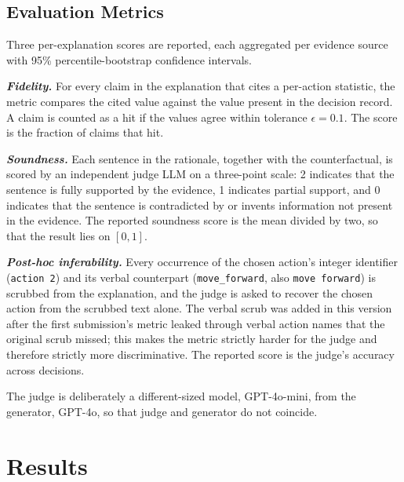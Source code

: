 \documentclass[conference]{IEEEtran}
\begin{document}
\subsection{Evaluation Metrics}
\label{sec:metrics}
Three per-explanation scores are reported, each aggregated per
evidence source with 95\% percentile-bootstrap confidence intervals.

\textbf{\emph{Fidelity.}} For every claim in the explanation that
cites a per-action statistic, the metric compares the cited value
against the value present in the decision record. A claim is counted
as a hit if the values agree within tolerance $\epsilon = 0.1$. The
score is the fraction of claims that hit.

\textbf{\emph{Soundness.}} Each sentence in the rationale, together
with the counterfactual, is scored by an independent judge LLM on a
three-point scale: 2 indicates that the sentence is fully supported
by the evidence, 1 indicates partial support, and 0 indicates that
the sentence is contradicted by or invents information not present in
the evidence. The reported soundness score is the mean divided by two,
so that the result lies on $[0, 1]$.

\textbf{\emph{Post-hoc inferability.}} Every occurrence of the chosen
action's integer identifier (\texttt{action 2}) and its verbal
counterpart (\texttt{move\_forward}, also \texttt{move forward}) is
scrubbed from the explanation, and the judge is asked to recover the
chosen action from the scrubbed text alone. The verbal scrub was
added in this version after the first submission's metric leaked
through verbal action names that the original scrub missed; this
makes the metric strictly harder for the judge and therefore
strictly more discriminative. The reported score is the judge's
accuracy across decisions.

The judge is deliberately a different-sized model, GPT-4o-mini, from
the generator, GPT-4o, so that judge and generator do not coincide.

\section{Results}
\label{sec:results}
\end{document}
